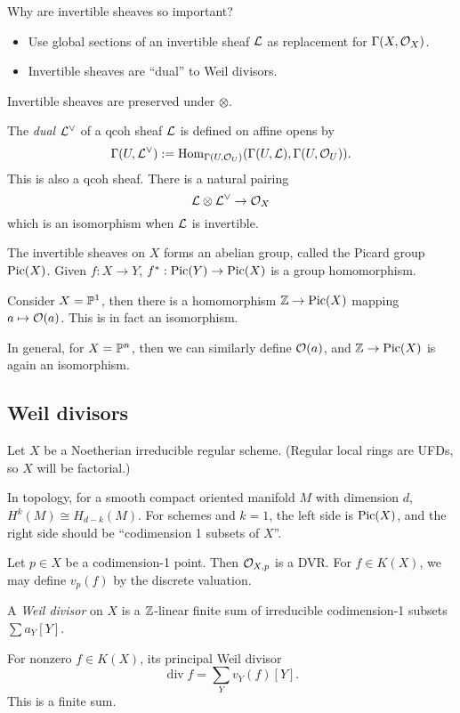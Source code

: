 \documentclass[11pt]{amsart}
\begin{document}
Why are invertible sheaves so important?
\begin{itemize}
    \item Use global sections of an invertible sheaf $\mathcal{L}$ as replacement for $\Gamma(X,\mathcal{O}_X)$.
    \item Invertible sheaves are ``dual'' to Weil divisors.
\end{itemize}

Invertible sheaves are preserved under $\otimes$.

\begin{defn}
    The \emph{dual} $\mathcal{L}^\vee$ of a qcoh sheaf $\mathcal{L}$ is defined on affine opens by
    \[\Gamma(U, \mathcal{L}^\vee) := \operatorname{Hom}_{\Gamma(U, \mathcal{O}_U)}(\Gamma(U, \mathcal{L}), \Gamma(U, \mathcal{O}_U)).\]
    This is also a qcoh sheaf. There is a natural pairing
    \[\mathcal{L}\otimes \mathcal{L}^\vee \to \mathcal{O}_X\]
    which is an isomorphism when $\mathcal{L}$ is invertible.
\end{defn}

\begin{defn}
    The invertible sheaves on $X$ forms an abelian group, called the Picard group $\operatorname{Pic}(X)$. Given $f:X\to Y$, $f^\ast:\operatorname{Pic}(Y)\to \operatorname{Pic}(X)$ is a group homomorphism.
\end{defn}

\begin{exm}
    Consider $X = \mathbb{P}^1$, then there is a homomorphism $\mathbb{Z}\to \operatorname{Pic}(X)$ mapping $a\mapsto \mathcal{O}(a)$. This is in fact an isomorphism.

    In general, for $X = \mathbb{P}^n$, then we can similarly define $\mathcal{O}(a)$, and $\mathbb{Z}\to \operatorname{Pic}(X)$ is again an isomorphism.
\end{exm}


\subsection{Weil divisors}

Let $X$ be a Noetherian irreducible regular scheme. (Regular local rings are UFDs, so $X$ will be factorial.)

In topology, for a smooth compact oriented manifold $M$ with dimension $d$, $H^k(M)\cong H_{d-k}(M)$. For schemes and $k=1$, the left side is $\operatorname{Pic}(X)$, and the right side should be ``codimension 1 subsets of $X$''.

Let $p\in X$ be a codimension-1 point. Then $\mathcal{O}_{X,p}$ is a DVR. For $f\in K(X)$, we may define $v_p(f)$ by the discrete valuation. 

\begin{defn}
    A \emph{Weil divisor} on $X$ is a $\mathbb{Z}$-linear finite sum of irreducible codimension-1 subsets $\sum a_Y [Y]$. 

    For nonzero $f\in K(X)$, its principal Weil divisor
    \[\operatorname{div} f = \sum_Y v_Y(f) [Y].\]
    This is a finite sum.
\end{defn}
\end{document}
